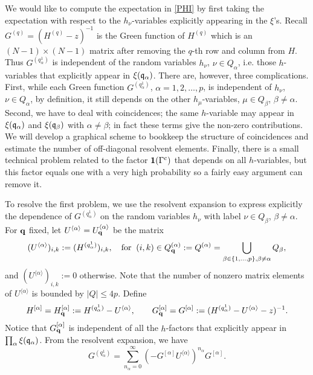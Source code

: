 \documentclass[draft]{article}
\newcommand{\bq}{{\bf {q}}}
\newcommand{\fq}{{\frak q}}
\newcommand{\sa}{{[\alpha ]}}
\newcommand{\al}{\alpha}
\newcommand{\be}{\begin{equation}}
\newcommand{\ee}{\end{equation}}
\numberwithin{equation}{section}
\numberwithin{theorem}{section}
\numberwithin{definition}{section}
\numberwithin{remark}{section}
\begin{document}
 We would like to compute the expectation in \eqref{PHI} by
first taking the expectation with respect to the $h_\nu$-variables explicitly
appearing in the $\xi$'s. 
Recall $G^{(q)}=(H^{(q)}-z)^{-1}$ is the Green function of $H^{(q)}$ 
which is an $(N-1) \times (N-1)$ matrix after removing the
 $q$-th row and column from $H$. Thus  $G^{(q_\alpha^1)}$
is independent of the random variables  $h_\nu$, $\nu\in Q_\al$,
i.e. those $h$-variables that  explicitly appear in $\xi(\fq_\al)$.
 There are, however, three complications. 
First, while each Green function $G^{(q_\al^1)}$, $\al =1,2,\ldots , p$,
is independent of  $h_\nu$, $\nu\in Q_\al$, 
by definition,  it still  depends on the
other $h_\mu$-variables, $\mu\in Q_\beta$, $\beta\ne \al$.
Second, we have
to deal with coincidences; the same $h$-variable may appear in
$\xi(\fq_\al)$ and $\xi(\fq_\beta)$ with $\al\ne \beta$; in fact
these terms give the non-zero contributions. We will develop a 
graphical scheme to bookkeep the structure of coincidences
and estimate the number of off-diagonal resolvent elements.
Finally, there is a small technical problem related to
the factor ${\bf 1}(\Gamma^c)$ that depends on all 
$h$-variables, but this factor equals one with a very high probability
so a fairly easy argument can remove it.

To resolve the first problem, we  use the resolvent expansion to express explicitly the
dependence of $G^{(q_\alpha^1)}$ on the random variables 
$h_\nu$ with label $\nu\in Q_\beta$, $\beta\ne\al$.
For $\bq $ fixed, let $U^{\langle \alpha \rangle }= 
U^{\langle \alpha \rangle }_{\bq}$ be the matrix
\be
(U^{\langle \alpha \rangle })_{ i,k}: = (H^{(q^1_\alpha)})_{ i, k }, 
\quad
\mbox{for}\;\;  (i, k) \in   Q^{(\alpha)}_\bq : = Q^{(\al)}=
 \bigcup_{\beta \in \{1, \ldots, p\}, \beta   \not = \alpha}  Q_\beta, 
\ee
and $(U^{\langle \alpha \rangle })_{ i,k}:=0$ otherwise. 
Note that the number of nonzero matrix elements of $U^{\langle \alpha \rangle }$ 
is bounded by $|Q|\le 4p$.
Define 
\[
H^\sa=H^\sa_\bq:= H^{(q_\alpha^1)} - U^{\langle \alpha \rangle }, \qquad
G^{\sa}_\bq=G^{\sa }:= (H^{(q_\alpha^1)} - U^{\langle \alpha \rangle } - z)^{-1} .
\]
Notice that $G^{\sa}_\bq$ is independent of all the $h$-factors that explicitly
appear in $\prod_\al \xi(\fq_\al)$.
{F}rom the resolvent expansion, we have 
\be
G^{(q_\alpha^1)} = \sum_{n_\alpha=0}^\infty
  (-G^{\sa } U^{\langle \alpha \rangle } )^{n_\alpha}G^{\sa }. 
\label{exp}
\ee
\end{document}
